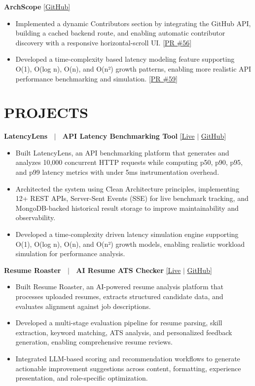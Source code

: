 \documentclass[10.5pt,letterpaper]{article}
\begin{document}
\textbf{ArchScope} \href{https://github.com/Arch-Scope/ArchScope-public/}{[GitHub]}
\begin{itemize}
  \item Implemented a dynamic Contributors section by integrating the GitHub API, building a cached backend route, and enabling automatic contributor discovery with a responsive horizontal-scroll UI. \href{https://github.com/Arch-Scope/ArchScope-public/pull/56}{[PR \#56]}
  \item Developed a time-complexity based latency modeling feature supporting O(1), O(log n), O(n), and O(n²) growth patterns, enabling more realistic API performance benchmarking and simulation. \href{https://github.com/Arch-Scope/ArchScope-public/pull/59}{[PR \#59]}
\end{itemize}

\section*{PROJECTS}

\textbf{LatencyLens \ $|$ \ API Latency Benchmarking Tool} \href{https://latencylens-app.vercel.app/}{[Live} $|$ \href{https://github.com/amankr32/LatencyLens}{GitHub]}
\begin{itemize}
  \item Built LatencyLens, an API benchmarking platform that generates and analyzes 10,000 concurrent HTTP requests while computing p50, p90, p95, and p99 latency metrics with under 5ms instrumentation overhead.
  \item Architected the system using Clean Architecture principles, implementing 12+ REST APIs, Server-Sent Events (SSE) for live benchmark tracking, and MongoDB-backed historical result storage to improve maintainability and observability.
  \item Developed a time-complexity driven latency simulation engine supporting O(1), O(log n), O(n), and O(n²) growth models, enabling realistic workload simulation for performance analysis.
\end{itemize}

\textbf{Resume Roaster \ $|$ \ AI Resume ATS Checker} \href{https://resumeoptimizer-app.vercel.app/}{[Live} $|$ \href{https://github.com/amankr32/Resume_Optimizer}{GitHub]}
\begin{itemize}
  \item Built Resume Roaster, an AI-powered resume analysis platform that processes uploaded resumes, extracts structured candidate data, and evaluates alignment against job descriptions.
  \item Developed a multi-stage evaluation pipeline for resume parsing, skill extraction, keyword matching, ATS analysis, and personalized feedback generation, enabling comprehensive resume reviews.
  \item Integrated LLM-based scoring and recommendation workflows to generate actionable improvement suggestions across content, formatting, experience presentation, and role-specific optimization.
\end{itemize}
\end{document}
